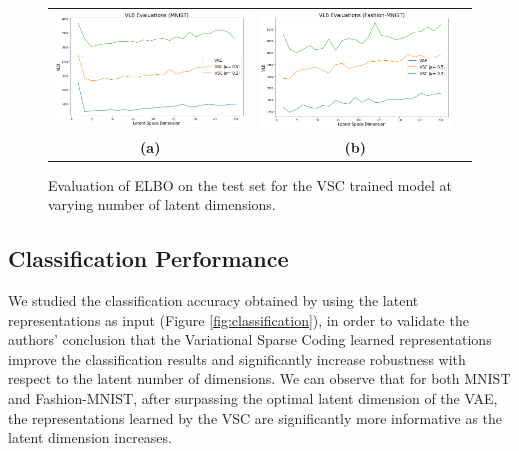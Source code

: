 \begin{figure}[h]
    \centering
    \captionsetup{justification=centering,margin=1cm}
    \begin{tabular}{ccc}
    \includegraphics[width=.45\textwidth]{figures/mnist_vlb} &
    \includegraphics[width=.45\textwidth]{figures/mnist_fashion_vlb} \\
    \textbf{(a)}  & \textbf{(b)}   \\[6pt]
\end{tabular}
    \centering
    \caption{Evaluation of ELBO on the test set for the VSC trained model at varying number of latent dimensions.}
    \label{fig:vlb}
\end{figure}

\subsection{Classification Performance}
We studied the classification accuracy obtained by using the latent representations as input (Figure \ref{fig:classification}), in order to validate the authors' conclusion that the Variational Sparse Coding learned representations improve the classification results and significantly increase robustness with respect to the latent number of dimensions. We can observe that for both MNIST and Fashion-MNIST, after surpassing the optimal latent dimension of the VAE, the representations learned by the VSC are significantly more informative as the latent dimension increases.

